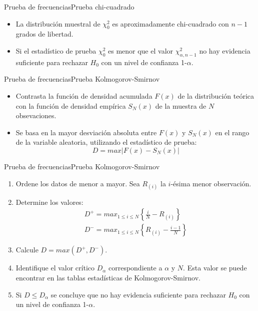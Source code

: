 \begin{frame}{Prueba de frecuencias}{Prueba chi-cuadrado}
    \begin{itemize}
        \item La distribución muestral de $\chi_0^2$ es aproximadamente chi-cuadrado con $n-1$ grados de libertad.
        \item Si el estadístico de prueba $\chi_0^2$ es menor que el valor $\chi_{\alpha,n-1}^2$ no hay evidencia suficiente para rechazar $H_0$ con un nivel de confianza 1-$\alpha$.
    \end{itemize}
\end{frame}

\begin{frame}{Prueba de frecuencias}{Prueba Kolmogorov-Smirnov}
    \begin{itemize}
        \item Contrasta la función de densidad acumulada $F(x)$ de la distribución teórica con la función de densidad empírica $S_N(x)$ de la muestra de $N$ obsevaciones.
        \item Se basa en la mayor desviación absoluta entre $F(x)$ y $S_N(x)$ en el rango de la variable aleatoria, utilizando el estadístico de prueba:
        \begin{equation*}
            D=max |F(x)-S_N(x)|
        \end{equation*}
    \end{itemize}
\end{frame}

\begin{frame}{Prueba de frecuencias}{Prueba Kolmogorov-Smirnov}
    \begin{enumerate}
        \item Ordene los datos de menor a mayor. Sea $R_{(i)}$ la $i$-ésima menor observación.
        \item Determine los valores:
            \begin{eqnarray*}
                D^+=max_{1\leq i \leq N} \left\{\frac{i}{N}-R_{(i)}\right\} \\
                D^-=max_{1\leq i \leq N} \left\{R_{(i)} - \frac{i-1}{N}\right\}
            \end{eqnarray*}
        \item Calcule $D=max(D^+,D^-)$.
        \item Identifique el valor crítico $D_{\alpha}$ correspondiente a $\alpha$ y $N$. Esta valor se puede encontrar en las tablas estadísticas de Kolmogorov-Smirnov.
        \item Si $D\leq D_{\alpha}$ se concluye que no hay evidencia suficiente para rechazar $H_0$ con un nivel de confianza 1-$\alpha$.
    \end{enumerate}
\end{frame}

